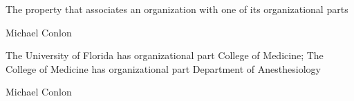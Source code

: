 \documentclass[letterpaper,10pt,english]{sphinxmanual}
\begin{document}
\begin{sphinxShadowBox}

\sphinxAtStartPar
{}
\end{sphinxShadowBox}

\begin{sphinxShadowBox}

\sphinxAtStartPar
The property that associates an organization with one of its organizational parts
\end{sphinxShadowBox}

\begin{sphinxShadowBox}

\sphinxAtStartPar
Michael Conlon 
\end{sphinxShadowBox}

\begin{sphinxShadowBox}

\sphinxAtStartPar
{\hyperref[\detokenize{doc-ORG_0000001::doc}]{}}
\end{sphinxShadowBox}

\begin{sphinxShadowBox}

\sphinxAtStartPar
{\hyperref[\detokenize{doc-ORG_0000005::doc}]{}}
\end{sphinxShadowBox}

\begin{sphinxShadowBox}

\sphinxAtStartPar
{\hyperref[\detokenize{doc-ORG_2000010::doc}]{}}
\end{sphinxShadowBox}

\begin{sphinxShadowBox}

\sphinxAtStartPar
The University of Florida has organizational part College of Medicine; The College of Medicine has organizational part Department of Anesthesiology
\end{sphinxShadowBox}

\begin{sphinxShadowBox}

\sphinxAtStartPar
Michael Conlon 
\end{sphinxShadowBox}
\begin{quote}

\ignorespaces \end{quote}
\end{document}
